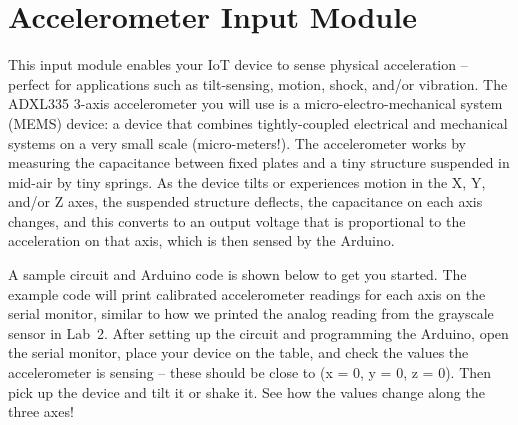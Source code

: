 
\clearpage
\section{Accelerometer Input Module}
\label{sec-input-accel}

This input module enables your IoT device to sense physical acceleration
-- perfect for applications such as tilt-sensing, motion, shock, and/or
vibration. The ADXL335 3-axis accelerometer you will use is a
micro-electro-mechanical system (MEMS) device: a device that combines
tightly-coupled electrical and mechanical systems on a very small scale
(micro-meters!). The accelerometer works by measuring the capacitance
between fixed plates and a tiny structure suspended in mid-air by tiny
springs. As the device tilts or experiences motion in the X, Y, and/or Z
axes, the suspended structure deflects, the capacitance on each axis
changes, and this converts to an output voltage that is proportional to
the acceleration on that axis, which is then sensed by the Arduino.

A sample circuit and Arduino code is shown below to get you started.
The example code will print calibrated accelerometer readings for each
axis on the serial monitor, similar to how we printed the analog reading
from the grayscale sensor in Lab~2. After setting up the circuit and
programming the Arduino, open the serial monitor, place your device on
the table, and check the values the accelerometer is sensing -- these
should be close to (x = 0, y = 0, z = 0). Then pick up the device and tilt
it or shake it. See how the values change along the three axes!

